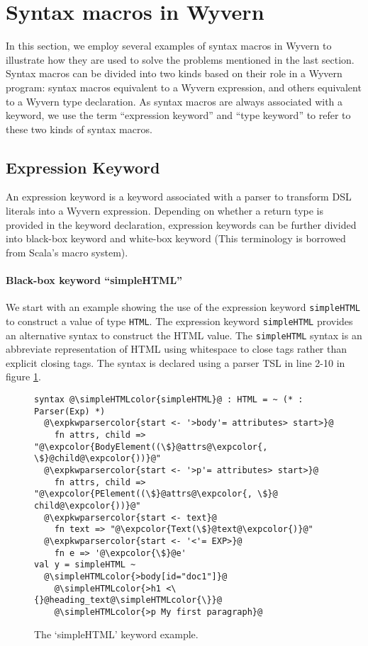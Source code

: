 \documentclass{sig-alternate}
\newcommand{\expkwparsercolor}[1]{\textcolor[HTML]{336699}{#1}}
\newcommand{\expcolor}[1]{\textcolor[HTML]{FF0033}{#1}}
\newcommand{\simpleHTMLcolor}[1]{\textcolor[HTML]{7D5100}{#1}}
\newcommand{\mycaption}[1]{\vspace{-4px}\caption{#1}\vspace{-2px}}
\begin{document}
\section{Syntax macros in Wyvern}
In this section, we employ several examples of syntax macros in Wyvern to illustrate how they are used to solve the problems mentioned in the last section. Syntax macros can be divided into two kinds based on their role in a Wyvern program: syntax macros equivalent to a Wyvern expression, and others equivalent to a Wyvern type declaration. As syntax macros are always associated with a keyword, we use the term ``expression keyword'' and ``type keyword'' to refer to these two kinds of syntax macros.

\subsection{Expression Keyword}
An expression keyword is a keyword associated with a parser to transform DSL literals into a Wyvern expression. Depending on whether a return type is provided in the keyword declaration, expression keywords can be further divided into black-box keyword and white-box keyword (This terminology is borrowed from Scala's macro system). 

\paragraph{Black-box keyword ``simpleHTML''}
We start with an example showing the use of the expression keyword \verb|simpleHTML| to construct a value of type \verb|HTML|. The expression keyword \verb|simpleHTML| provides an alternative syntax to construct the HTML value. The \verb|simpleHTML| syntax is an abbreviate representation of HTML using whitespace to close tags rather than explicit closing tags. The syntax is declared using a parser TSL in line 2-10 in figure \ref{f-simplehtml}.

\begin{figure}[ht]
\begin{lstlisting}[style=wyvern]
syntax @\simpleHTMLcolor{simpleHTML}@ : HTML = ~ (* : Parser(Exp) *)
  @\expkwparsercolor{start <- '>body'= attributes> start>}@
    fn attrs, child => "@\expcolor{BodyElement((\$}@attrs@\expcolor{, \$}@child@\expcolor{))}@"
  @\expkwparsercolor{start <- '>p'= attributes> start>}@
    fn attrs, child => "@\expcolor{PElement((\$}@attrs@\expcolor{, \$}@ child@\expcolor{))}@"
  @\expkwparsercolor{start <- text}@
    fn text => "@\expcolor{Text(\$}@text@\expcolor{)}@"
  @\expkwparsercolor{start <- '<'= EXP>}@
    fn e => '@\expcolor{\$}@e'
val y = simpleHTML ~
  @\simpleHTMLcolor{>body[id="doc1"]}@
    @\simpleHTMLcolor{>h1 <\{}@heading_text@\simpleHTMLcolor{\}}@
    @\simpleHTMLcolor{>p My first paragraph}@
\end{lstlisting}
\mycaption{The `simpleHTML' keyword example.}
\label{f-simplehtml}
\end{figure}
\end{document}
